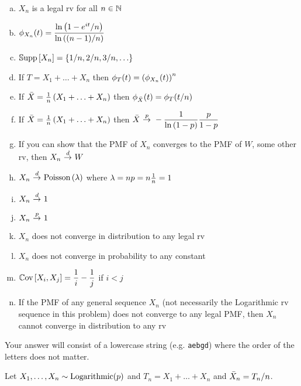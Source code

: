 \documentclass[12pt,landscape]{article}
\newcommand{\instr}{\small Your answer will consist of a lowercase string (e.g. \texttt{aebgd}) where the order of the letters does not matter. \normalsize}
\begin{document}
\vspace{-0.2cm}\benum{} 

\begin{multicols}{2}
\begin{enumerate}[(a)]
\item $X_n$ is a legal rv for all $n \in \mathbb{N}$
\item $\phi_{X_n}(t) = \displaystyle\frac{\ln\left(1-e^{it}/n\right)}{\ln\left((n-1)/n\right)}$

\item $\mathbb{S}\text{upp}\left[X_n\right] = \left\{1/n, 2/n, 3/n, \ldots\right\}$

\item If $T = X_1 + \ldots + X_n$ then $\phi_{T}(t) = \left(\phi_{X_n}(t)\right)^{n}$
\item If $\bar{X} = \frac{1}{n}\left(X_1 + \ldots + X_n\right)$ then $\phi_{\bar{X}}(t) = \phi_{T}(t/n)$
\item If $\bar{X} = \frac{1}{n}\left(X_1 + \ldots + X_n\right)$ then $\Xbar \convp -\displaystyle\oneover{\natlog{1-p}}\frac{p}{1-p}$


\item If you can show that the PMF of $X_n$ converges to the PMF of $W$, some other rv, then $X_n \convd W$

\item $X_n \convd \poisson{\lambda}$ where $\lambda  = np = n \frac{1}{n} = 1$
\item $X_n \convd 1$
\item $X_n \convp 1$
\item $X_n$ does not converge in distribution to any legal rv
\item $X_n$ does not converge in probability to any constant

\item $\mathbb{C}\text{ov}\left[X_i, X_j\right] = \displaystyle\frac{1}{i} - \frac{1}{j}$ if $i < j$

\item If the PMF of any general sequence $X_n$ (not necessarily the Logarithmic rv sequence in this problem) does not converge to any legal PMF, then $X_n$ cannot converge in distribution to any rv
\end{enumerate}
\end{multicols}
\eenum\instr\pagebreak


\problem{}  Let $X_1, \ldots, X_n \sim \text{Logarithmic}(p)$ and $T_n = X_1 + \ldots + X_n$ and $\bar{X}_n = T_n / n$.
\end{document}
